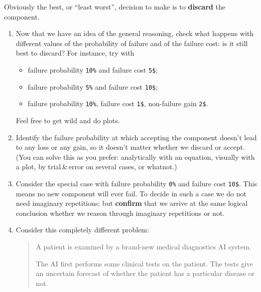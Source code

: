 \documentclass[
  a4paper,
  DIV=11,
  numbers=noendperiod,
  oneside]{scrreprt}
\providecommand{\tightlist}{%
  \setlength{\itemsep}{0pt}\setlength{\parskip}{0pt}}\usepackage{longtable,booktabs,array}
\begin{document}
Obviously the best, or ``least worst'', decision to make is to
\textbf{discard} the component.

\begin{tcolorbox}[enhanced jigsaw, titlerule=0mm, toprule=.15mm, toptitle=1mm, bottomrule=.15mm, leftrule=.75mm, title={\faIcon{pen} Exercises}, arc=.35mm, breakable, left=2mm, coltitle=black, colframe=quarto-callout-caution-color-frame, colbacktitle=quarto-callout-caution-color!10!white, bottomtitle=1mm, rightrule=.15mm, opacitybacktitle=0.6, opacityback=0, colback=white]

\begin{enumerate}
\def\labelenumi{\arabic{enumi}.}
\item
  Now that we have an idea of the general reasoning, check what happens
  with different values of the probability of failure and of the failure
  cost: is it still best to discard? For instance, try with

  \begin{itemize}
  \tightlist
  \item
    failure probability \texttt{10\%} and failure cost \texttt{5\$};
  \item
    failure probability \texttt{5\%} and failure cost \texttt{10\$};
  \item
    failure probability \texttt{10\%}, failure cost \texttt{1\$},
    non-failure gain \texttt{2\$}.
  \end{itemize}

  Feel free to get wild and do plots.
\item
  Identify the failure probability at which accepting the component
  doesn't lead to any loss or any gain, so it doesn't matter whether we
  discard or accept. (You can solve this as you prefer: analytically
  with an equation, visually with a plot, by trial\,\&\,error on several
  cases, or whatnot.)
\item
  Consider the special case with failure probability \texttt{0\%} and
  failure cost \texttt{10\$}. This means no new component will ever
  fail. To decide in such a case we do not need imaginary repetitions;
  but \textbf{confirm} that we arrive at the same logical conclusion
  whether we reason through imaginary repetitions or not.
\item
  Consider this completely different problem:

  \begin{quote}
  A patient is examined by a brand-new medical diagnostics AI system.

  The AI first performs some clinical tests on the patient. The tests
  give an uncertain forecast of whether the patient has a particular
  disease or not.


\end{quote}
\end{enumerate}
\end{tcolorbox}
\end{document}
